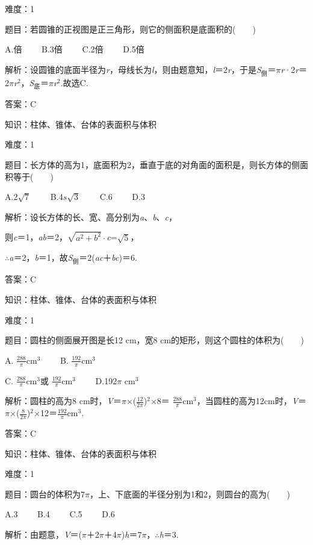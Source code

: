 \documentclass{article} %
\begin{document}
难度：1

题目：若圆锥的正视图是正三角形，则它的侧面积是底面积的(　　)

A.倍　　 B.3倍　　 C.2倍　　 D.5倍

解析：设圆锥的底面半径为\textit{r}，母线长为\textit{l}，则由题意知，\textit{l}＝2\textit{r}，于是\textit{S}${}_{\textrm{侧}}$＝\textit{$\pi$r}·2\textit{r}＝2\textit{$\pi$r}${}^{2}$，\textit{S}${}_{\textrm{底}}$＝\textit{$\pi$r}${}^{2}$.故选C.

答案：C

知识：柱体、锥体、台体的表面积与体积

难度：1

题目：长方体的高为1，底面积为2，垂直于底的对角面的面积是，则长方体的侧面积等于(　　)

A.2$\sqrt{7}$　　 B.4$s\sqrt{3}$　　 C.6　　 D.3

解析：设长方体的长、宽、高分别为\textit{a}、\textit{b}、\textit{c}，

则\textit{c}＝1，\textit{ab}＝2，$\sqrt{a^2+b^2}\cdot$\textit{c}=$\sqrt{5}$，

$\mathrm{\therefore}$\textit{a}＝2，\textit{b}＝1，故\textit{S}${}_{\textrm{侧}}$＝2(\textit{ac}＋\textit{bc})＝6.

答案：C

知识：柱体、锥体、台体的表面积与体积

难度：1

题目：圆柱的侧面展开图是长12 cm，宽8 cm的矩形，则这个圆柱的体积为(　　)

A. $\frac{288}{\pi}$cm$^3$　　  B. $\frac{192}{\pi}$cm$^3$

C. $\frac{288}{\pi}$cm$^3$或 $\frac{192}{\pi}$cm$^3$　　 D.192$\pi$ cm$^3$

解析：圆柱的高为8 cm时，\textit{V}＝$\pi$$\mathrm{\times}$($\frac{12}{2\pi}$)${}^{2}$$\mathrm{\times}$8＝ $\frac{288}{\pi}$cm${}^{3}$，当圆柱的高为12cm时，\textit{V}＝$\pi$$\mathrm{\times}$($\frac{8}{2\pi}$)${}^{2}$$\mathrm{\times}$12＝$\frac{192}{\pi}$cm${}^{3}$.

答案：C

知识：柱体、锥体、台体的表面积与体积

难度：1

题目：圆台的体积为7$\pi$，上、下底面的半径分别为1和2，则圆台的高为(　　)

A.3　　 B.4　　 C.5　　 D.6

解析：由题意，\textit{V}＝($\pi$＋2$\pi$＋4$\pi$)\textit{h}＝7$\pi$，$\mathrm{\therefore}$\textit{h}＝3.
\end{document}
